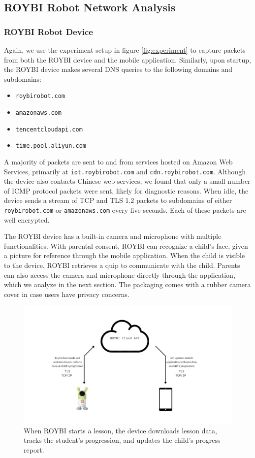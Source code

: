 \documentclass[12pt]{ucthesis}
\begin{document}
\subsection{ROYBI Robot Network Analysis}

\subsubsection{ROYBI Robot Device}
Again, we use the experiment setup in figure \ref{fig:experiment} to capture packets from both the ROYBI device and the mobile application. Similarly, upon startup, the ROYBI device makes several DNS queries to the following domains and subdomains:

\begin{itemize}
\item \texttt{roybirobot.com}
\item \texttt{amazonaws.com}
\item \texttt{tencentcloudapi.com}
\item \texttt{time.pool.aliyun.com}
\end{itemize}

A majority of packets are sent to and from services hosted on Amazon Web Services, primarily at \texttt{iot.roybirobot.com} and \texttt{cdn.roybirobot.com}. Although the device also contacts Chinese web services, we found that only a small number of ICMP protocol packets were sent, likely for diagnostic reasons. When idle, the device sends a stream of TCP and TLS 1.2 packets to subdomains of either \texttt{roybirobot.com} or \texttt{amazonaws.com} every five seconds. Each of these packets are well encrypted.

The ROYBI device has a built-in camera and microphone with multiple functionalities. With parental consent, ROYBI can recognize a child's face, given a picture for reference through the mobile application. When the child is visible to the device, ROYBI retrieves a quip to communicate with the child. Parents can also access the camera and microphone directly through the application, which we analyze in the next section. The packaging comes with a rubber camera cover in case users have privacy concerns. 

\begin{figure}
    \includegraphics[width=\textwidth]{lesson.jpg}
    \caption{When ROYBI starts a lesson, the device downloads lesson data, tracks the student's progression, and updates the child's progress report.}
    \label{fig:lesson}
\end{figure}
\end{document}

